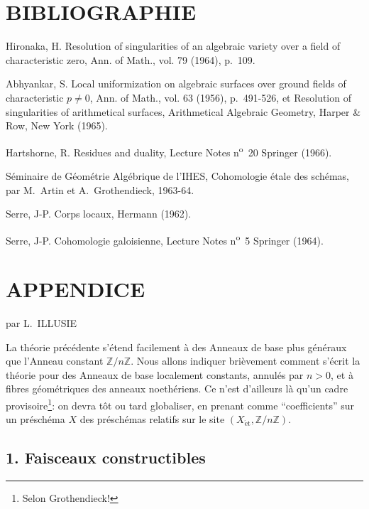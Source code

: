 \documentclass[11pt]{article}
\newcommand{\Z}{\mathbb{Z}}
\providecommand{\Z}{\mathbb Z}
\begin{document}
\section*{BIBLIOGRAPHIE}

\begin{description}[leftmargin=2.5cm,style=nextline]
\item[{[2]}]
Hironaka, H. Resolution of singularities of an algebraic variety over a field of characteristic zero, Ann. of Math., vol. 79 (1964), p.~109.
\item[{[1]}] Abhyankar, S. Local uniformization on algebraic surfaces over ground fields of characteristic $p\ne0$, Ann. of Math., vol. 63 (1956), p.~491-526, et Resolution of singularities of arithmetical surfaces, Arithmetical Algebraic Geometry, Harper \& Row, New York (1965).
\item[{[H]}] Hartshorne, R. Residues and duality, Lecture Notes n\textsuperscript{o}~20 Springer (1966).
\item[{[SGAA]}] Séminaire de Géométrie Algébrique de l'IHES, Cohomologie étale des schémas, par M.~Artin et A.~Grothendieck, 1963-64.
\item[{[CL]}] Serre, J-P. Corps locaux, Hermann (1962).
\item[{[CG]}] Serre, J-P. Cohomologie galoisienne, Lecture Notes n\textsuperscript{o}~5 Springer (1964).
\end{description}

\section*{APPENDICE}
\begin{center}
par L.~ILLUSIE
\end{center}

La théorie précédente s'étend facilement à des Anneaux de base plus généraux que l'Anneau constant $\Z/n\Z$. Nous allons indiquer brièvement comment s'écrit la théorie pour des Anneaux de base localement constants, annulés par $n>0$, et à fibres géométriques des anneaux noethériens. Ce n'est d'ailleurs là qu'un cadre provisoire\footnote{Selon Grothendieck!}: on devra tôt ou tard globaliser, en prenant comme ``coefficients'' sur un préschéma $X$ des préschémas relatifs sur le site $(X_{\mathrm{\acute et}},\Z/n\Z)$.

\subsection*{1. Faisceaux constructibles}
\end{document}
